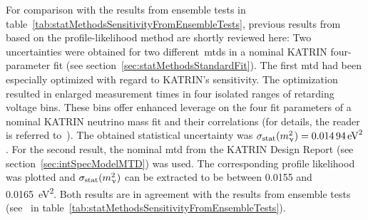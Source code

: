 For comparison with the results from ensemble tests in table~\ref{tab:statMethodsSensitivityFromEnsembleTests}, previous results from~\cite{Kleesiek2014} based on the profile-likelihood method are shortly reviewed here: Two uncertainties were obtained for two different~\gls{mtd}s in a nominal KATRIN four-parameter fit (see section~\ref{sec:statMethodsStandardFit}). The first \gls{mtd} had been especially optimized with regard to KATRIN's sensitivity. The optimization resulted in enlarged measurement times in four isolated ranges of retarding voltage bins. These bins offer enhanced leverage on the four fit parameters of a nominal KATRIN neutrino mass fit and their correlations (for details, the reader is referred to~\cite{Kleesiek2014}). The obtained statistical uncertainty was $\sigma_\mathrm{stat}(m_\upnu^2)=\SI{0.01494}{eV^2}$. For the second result, the nominal \gls{mtd} from the KATRIN Design Report (see section~\ref{sec:intSpecModelMTD}) was used. The corresponding profile likelihood was plotted and $\sigma_\mathrm{stat}(m_\upnu^2)$ can be extracted to be between \SI{0.0155}{} and \SI{0.0165}{eV^2}. Both results are in agreement with the results from ensemble tests (see~\cite{Kleesiek2014} in table~\ref{tab:statMethodsSensitivityFromEnsembleTests}).